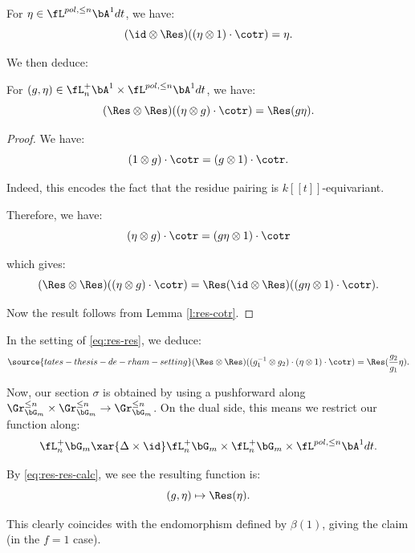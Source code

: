 \begin{lem}
\notready\label{l:res-cotr}

For $\eta \in \fL^{pol,\leq n} \bA^1 dt$, we have:
%
\[
(\id \otimes \Res)((\eta \otimes 1) \cdot \cotr) = \eta.
\]

\end{lem}

We then deduce:

\begin{lem}
\notready\label{l:res-res}

For $(g,\eta) \in  \fL_n^+\bA^1 \times \fL^{pol,\leq n} \bA^1 dt$, we have:
%
\[
(\Res \otimes \Res)((\eta \otimes g) \cdot \cotr) = \Res(g\eta).
\]

\end{lem}

\begin{proof}

We have:
%
\[
(1 \otimes g) \cdot \cotr = (g \otimes 1) \cdot \cotr.
\]

 Indeed, this encodes the fact that the residue pairing is
$k[[t]]$-equivariant.

Therefore, we have:
%
\[
(\eta \otimes g) \cdot \cotr = (g\eta \otimes 1) \cdot \cotr
\]

 which gives:
%
\[
(\Res \otimes \Res)((\eta \otimes g) \cdot \cotr) =
\Res (\id \otimes \Res)((g\eta \otimes 1) \cdot \cotr).
\]

 Now the result follows from Lemma \ref{l:res-cotr}.

\end{proof}

In the setting of \eqref{eq:res-res}, we deduce:
%
\begin{equation}\label{eq:res-res-calc}
\source{tates-thesis-de-rham-setting}
(\Res \otimes \Res)((g_1^{-1} \otimes g_2) \cdot
(\eta \otimes 1) \cdot \cotr) =
\Res(\frac{g_2}{g_1} \eta).
\end{equation}

Now, our section $\sigma$ is obtained by using a pushforward
along $\Gr_{\bG_m}^{\leq n} \times \Gr_{\bG_m}^{\leq n} \to \Gr_{\bG_m}^{\leq n}$.
On the dual side, this means we restrict our function along:
%
\[
\fL_n^+ \bG_m \xar{\Delta \times \id}
\fL_n^+\bG_m \times \fL_n^+\bG_m \times \fL^{pol,\leq n} \bA^1 dt.
\]

 By \eqref{eq:res-res-calc}, we see the resulting function is:
%
\[
(g,\eta) \mapsto \Res(\eta).
\]

This clearly coincides with the endomorphism defined by $\beta(1)$, giving the
claim (in the $f=1$ case).

